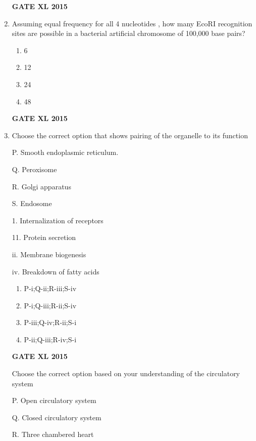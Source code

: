 \documentclass[journal,12pt,onecolumn]{IEEEtran}
\begin{document}
\begin{enumerate}
\hfill{\textbf{GATE XL 2015}}
\item Assuming equal frequency for all 4 nucleotides , how many EcoRI recognition sites  are possible in a bacterial artificial chromosome of 100,000 base pairs?
    \begin{enumerate}
            \item 6
	    \item 12
	    \item 24
            \item 48
    \end{enumerate}
\hfill{\textbf{GATE XL 2015}}
\item  Choose the correct option that shows pairing of the organelle to its function
	\begin{minipage}{0.5\textwidth}\begin{flushleft}
P. Smooth endoplasmic reticulum.

Q. Peroxisome

R. Golgi apparatus

S. Endosome
	\end{flushleft}
	\end{minipage}
	\begin{minipage}{0.5\textwidth}\begin{flushleft}
1. Internalization of receptors

11. Protein secretion

ii. Membrane biogenesis 

iv. Breakdown of fatty acids
	\end{flushleft}
	\end{minipage}
    \begin{enumerate}
            \item P-i;Q-ii;R-iii;S-iv
            \item P-i;Q-iii;R-ii;S-iv
            \item P-iii;Q-iv;R-ii;S-i
            \item P-ii;Q-iii;R-iv;S-i
    \end{enumerate}
\hfill{\textbf{GATE XL 2015}}

Choose the correct option based on your understanding of the circulatory system

	\begin{minipage}{0.5\textwidth}\begin{flushleft}
P. Open circulatory system

Q. Closed circulatory system

R. Three chambered heart


\end{flushleft}
\end{minipage}
\end{enumerate}
\end{document}
